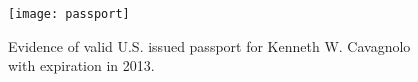 \documentclass[11pt]{cv}
\begin{document}
\begin{figure}[htp]
  \centering
  \begin{minipage}{0.9\linewidth}
    \texttt{[image: passport]}
    \caption{Evidence of valid U.S. issued passport for Kenneth
      W. Cavagnolo with expiration in 2013.}
  \end{minipage}
\end{figure}
\end{document}
